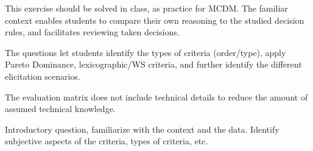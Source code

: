 \documentclass[answers, 10pt, UKenglish]{exam}
\begin{document}
\begin{questions}
\begin{solutionorbox}
	{
		\color{red}
		This exercise should be solved in class, as practice for MCDM.
		The familiar
		context enables students to compare their own reasoning to the
		studied decision rules, and facilitates reviewing taken
		decisions. 

		The questions let students identify the types of criteria
		(order/type),
		apply Pareto Dominance, lexicographic/WS criteria, and further
		identify the different elicitation scenarios. 

		The evaluation matrix does not include technical details to reduce
		the amount of assumed technical knowledge.
	}
\end{solutionorbox}

	\question
	
	
	\begin{solutionorbox}
	{ 
		\color{red} Introductory question, familiarize with the context
		and the data. Identify subjective aspects of the criteria, types 
		of criteria, etc.

}
\end{solutionorbox}
\end{questions}
\end{document}
